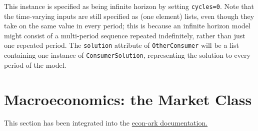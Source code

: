 \documentclass[12pt,titlepage,letterpaper]{econtex}
\begin{document}
{\vspace{0.25cm}

This instance is specified as being infinite horizon by setting \texttt{cycles=0}.  Note that the time-varying inputs are still specified as (one element) lists, even though they take on the same value in every period; this is because an infinite horizon model might consist of a multi-period sequence repeated indefinitely, rather than just one repeated period.  The \texttt{solution} attribute of \texttt{OtherConsumer} will be a list containing one instance of \texttt{ConsumerSolution}, representing the solution to every period of the model.

\section{Macroeconomics: the Market Class}\label{sec:Macroeconomics}

This section has been integrated into the \href{https://hark.readthedocs.io/en/latest/ARKitecture.html\#market-class}{econ-ark documentation.}

}
\end{document}
